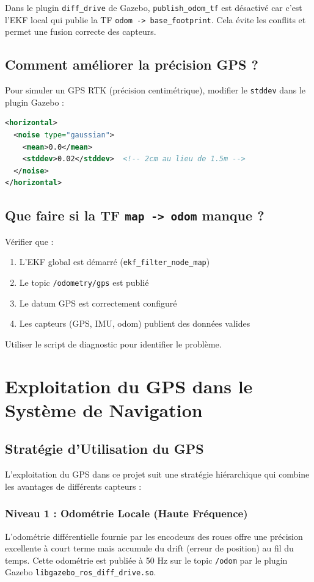 \documentclass[a4paper,12pt]{article}
\begin{document}
Dans le plugin \texttt{diff\_drive} de Gazebo, \texttt{publish\_odom\_tf} est désactivé car c'est l'EKF local qui publie la TF \texttt{odom -> base\_footprint}. Cela évite les conflits et permet une fusion correcte des capteurs.

\subsection{Comment améliorer la précision GPS ?}

Pour simuler un GPS RTK (précision centimétrique), modifier le \texttt{stddev} dans le plugin Gazebo :
\begin{lstlisting}[language=XML]
<horizontal>
  <noise type="gaussian">
    <mean>0.0</mean>
    <stddev>0.02</stddev>  <!-- 2cm au lieu de 1.5m -->
  </noise>
</horizontal>
\end{lstlisting}

\subsection{Que faire si la TF \texttt{map -> odom} manque ?}

Vérifier que :
\begin{enumerate}
    \item L'EKF global est démarré (\texttt{ekf\_filter\_node\_map})
    \item Le topic \texttt{/odometry/gps} est publié
    \item Le datum GPS est correctement configuré
    \item Les capteurs (GPS, IMU, odom) publient des données valides
\end{enumerate}

Utiliser le script de diagnostic pour identifier le problème.

\section{Exploitation du GPS dans le Système de Navigation}

\subsection{Stratégie d'Utilisation du GPS}

L'exploitation du GPS dans ce projet suit une stratégie hiérarchique qui combine les avantages de différents capteurs :

\subsubsection{Niveau 1 : Odométrie Locale (Haute Fréquence)}
L'odométrie différentielle fournie par les encodeurs des roues offre une précision excellente à court terme mais accumule du drift (erreur de position) au fil du temps. Cette odométrie est publiée à 50 Hz sur le topic \texttt{/odom} par le plugin Gazebo \texttt{libgazebo\_ros\_diff\_drive.so}.
\end{document}
